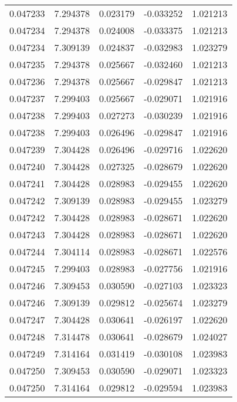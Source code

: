 \begin{tabular}{lrrrr}
0.047233    &  7.294378 &  0.023179 & -0.033252 &             1.021213 \\
0.047234    &  7.294378 &  0.024008 & -0.033375 &             1.021213 \\
0.047234    &  7.309139 &  0.024837 & -0.032983 &             1.023279 \\
0.047235    &  7.294378 &  0.025667 & -0.032460 &             1.021213 \\
0.047236    &  7.294378 &  0.025667 & -0.029847 &             1.021213 \\
0.047237    &  7.299403 &  0.025667 & -0.029071 &             1.021916 \\
0.047238    &  7.299403 &  0.027273 & -0.030239 &             1.021916 \\
0.047238    &  7.299403 &  0.026496 & -0.029847 &             1.021916 \\
0.047239    &  7.304428 &  0.026496 & -0.029716 &             1.022620 \\
0.047240    &  7.304428 &  0.027325 & -0.028679 &             1.022620 \\
0.047241    &  7.304428 &  0.028983 & -0.029455 &             1.022620 \\
0.047242    &  7.309139 &  0.028983 & -0.029455 &             1.023279 \\
0.047242    &  7.304428 &  0.028983 & -0.028671 &             1.022620 \\
0.047243    &  7.304428 &  0.028983 & -0.028671 &             1.022620 \\
0.047244    &  7.304114 &  0.028983 & -0.028671 &             1.022576 \\
0.047245    &  7.299403 &  0.028983 & -0.027756 &             1.021916 \\
0.047246    &  7.309453 &  0.030590 & -0.027103 &             1.023323 \\
0.047246    &  7.309139 &  0.029812 & -0.025674 &             1.023279 \\
0.047247    &  7.304428 &  0.030641 & -0.026197 &             1.022620 \\
0.047248    &  7.314478 &  0.030641 & -0.028679 &             1.024027 \\
0.047249    &  7.314164 &  0.031419 & -0.030108 &             1.023983 \\
0.047250    &  7.309453 &  0.030590 & -0.029071 &             1.023323 \\
0.047250    &  7.314164 &  0.029812 & -0.029594 &             1.023983 \\

\end{tabular}

